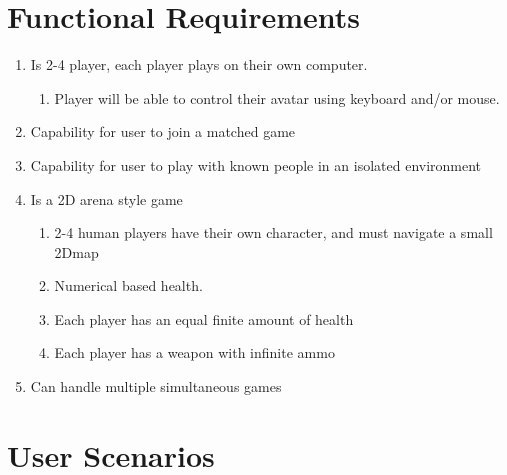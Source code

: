 \documentclass[11pt, oneside]{article}   	%
\begin{document}
\clearpage

\section{Functional Requirements}
\begin{enumerate}
\item Is 2-4 player, each player plays on their own computer. 
\begin{enumerate}
\item Player will be able to control their avatar using keyboard and/or mouse. 
\end{enumerate}
\item Capability for user to join a matched game
\item Capability for user to play with known people in an isolated environment
\item Is a 2D arena style game
\begin{enumerate}
\item 2-4 human players have their own character, and must navigate a small 2Dmap
\item Numerical based health.
\item Each player has an equal finite amount of health
\item Each player has a weapon with infinite ammo
\end{enumerate}
\item Can handle multiple simultaneous games
\end{enumerate}

\section{User Scenarios}
\end{document}
